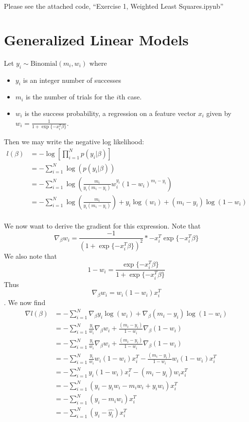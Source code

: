 \documentclass[12pt]{article}
\newenvironment{problem}[2][Exercise]{\begin{trivlist}
\item[\hskip \labelsep {\bfseries #1}\hskip \labelsep {\bfseries #2.}]}{\end{trivlist}}
\begin{document}
\begin{problem}{C, D}
Please see the attached code, ``Exercise 1, Weighted Least Squares.ipynb''
\end{problem}



\section*{Generalized Linear Models}

\begin{problem}{A}
Let $y_i \sim \text{Binomial}(m_i, w_i)$ where
\begin{itemize}
    \item $y_i$ is an integer number of successes
    \item $m_i$ is the number of trials for the $i$th case.
    \item $w_i$ is the success probability, a regression on a feature vector $x_i$ given by $w_i = \frac{1}{1 + \exp\{-x_i^T\beta\}}$.
\end{itemize}

Then we may write the negative log likelihood:
\begin{align*}
l(\beta) &= -\log \left[\prod_{i=1}^Np(y_i|\beta)\right]\\
&= - \sum_{i=1}^N \log(p(y_i|\beta))\\
&= - \sum_{i=1}^N \log(\frac{m_i}{y_i(m_i - y_i)}w_i^{y_i}(1-w_i)^{m_i-y_i})\\
&= - \sum_{i=1}^N \log(\frac{m_i}{y_i(m_i - y_i)}) + y_i\log(w_i) + (m_i - y_i)\log(1-w_i)\\
\end{align*}

We now want to derive the gradient for this expression.
Note that $$\nabla_\beta w_i = \frac{-1}{(1+\exp\{-x_i^T\beta\})^2}*-x_i^T\exp\{-x_i^T\beta\}$$
We also note that $$1 - w_i = \frac{\exp\{-x_i^T\beta\}}{1+\exp\{-x_i^T\beta\}}$$
Thus $$\nabla_\beta w_i = w_i(1-w_i)x_i^T$$.
We now find
\begin{align*}
\nabla l(\beta) &= -\sum_{i=1}^N \nabla_\beta y_i\log(w_i) + \nabla_\beta (m_i-y_i)\log(1-w_i)\\
&= -\sum_{i=1}^N \frac{y_i}{w_i}\nabla_\beta w_i + \frac{(m_i-y_i)}{1-w_i}\nabla_\beta (1-w_i)\\
&= -\sum_{i=1}^N \frac{y_i}{w_i}\nabla_\beta w_i + \frac{(m_i-y_i)}{1-w_i}\nabla_\beta(1- w_i)\\
&= -\sum_{i=1}^N \frac{y_i}{w_i}w_i(1-w_i)x_i^T- \frac{(m_i-y_i)}{1-w_i}w_i(1-w_i)x_i^T\\
&=-\sum_{i=1}^N y_i(1-w_i)x_i^T- (m_i-y_i)w_ix_i^T\\
&= -\sum_{i=1}^N (y_i - y_iw_i -m_iw_i + y_iw_i)x_i^T\\
&= -\sum_{i=1}^N (y_i - m_iw_i)x_i^T\\
&= -\sum_{i=1}^N (y_i - \hat{y_i})x_i^T
\end{align*}
\end{problem}
\end{document}
